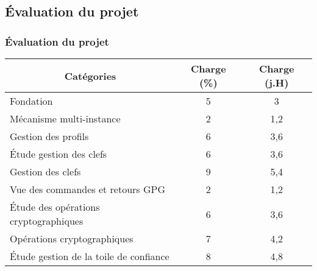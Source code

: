 \subsection{Évaluation du projet}
\begin{frame}
  \frametitle{\color{white} Évaluation du projet}
  \begin{tabular}{|l|l|l|}
    \hline
    \multicolumn{1}{|c|}{\cellcolor{gray} \color{white}Catégories} & \multicolumn{1}{|c|}{\cellcolor{gray} \color{white}Charge (\%)} & \multicolumn{1}{|c|}{\cellcolor{gray} \color{white}Charge (j.H)} \\
    \hline
    \cellcolor{bleu}\color{white}Fondation & \multicolumn{1}{|c|}{\cellcolor{bleu}\color{white}5} & \multicolumn{1}{|c|}{\cellcolor{bleu}\color{white}3} \\
    \hline
    \cellcolor{bleu}\color{white}Mécanisme multi-instance & \multicolumn{1}{|c|}{\cellcolor{bleu}\color{white}2} & \multicolumn{1}{|c|}{\cellcolor{bleu}\color{white}1,2} \\    
    \hline
    \cellcolor{bleu}\color{white}Gestion des profils & \multicolumn{1}{|c|}{\cellcolor{bleu}\color{white}6} & \multicolumn{1}{|c|}{\cellcolor{bleu}\color{white}3,6} \\
    \hline
    \cellcolor{bleu}\color{white}\'{E}tude gestion des clefs & \multicolumn{1}{|c|}{\cellcolor{bleu}\color{white}6} & \multicolumn{1}{|c|}{\cellcolor{bleu}\color{white}3,6} \\
    \hline
    \cellcolor{bleu}\color{white}Gestion des clefs & \multicolumn{1}{|c|}{\cellcolor{bleu}\color{white}9} & \multicolumn{1}{|c|}{\cellcolor{bleu}\color{white}5,4} \\
    \hline
    \cellcolor{bleu}\color{white}Vue des commandes et retours GPG & \multicolumn{1}{|c|}{\cellcolor{bleu}\color{white}2} & \multicolumn{1}{|c|}{\cellcolor{bleu}\color{white}1,2} \\
    \hline
    \cellcolor{orange}\color{white}\'{E}tude des opérations cryptographiques & \multicolumn{1}{|c|}{\cellcolor{orange}\color{white}6} & \multicolumn{1}{|c|}{\cellcolor{orange}\color{white}3,6} \\
    \hline
    \cellcolor{orange}\color{white}Opérations cryptographiques & \multicolumn{1}{|c|}{\cellcolor{orange}\color{white}7} & \multicolumn{1}{|c|}{\cellcolor{orange}\color{white}4,2} \\
    \hline
    \cellcolor{orange}\color{white}\'{E}tude gestion de la toile de confiance & \multicolumn{1}{|c|}{\cellcolor{orange}\color{white}8} & \multicolumn{1}{|c|}{\cellcolor{orange}\color{white}4,8} \\

\end{tabular}
\end{frame}

